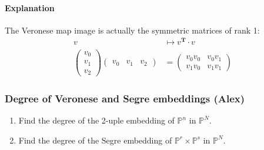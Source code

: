 \paragraph{Explanation} The Veronese map image is actually the symmetric matrices of rank 1:
\begin{align*}
	v&\longmapsto v^{\mathbf{T}}\cdot v\\
	\begin{pmatrix} v_0\\v_1\\v_2 \end{pmatrix} \begin{pmatrix} v_0&v_1&v_2 \end{pmatrix} & =\begin{pmatrix} v_0v_0&v_0v_1\\v_1v_0&v_1v_1 \end{pmatrix} 
\end{align*}

\subsubsection{Degree of Veronese and Segre embeddings (Alex)}

\begin{manualexercise}{7.1}\leavevmode 
	\begin{enumerate}[label=\alph*.]
		\item Find the degree of the 2-uple embedding of $\mathbb{P}^n$ in $\mathbb{P}^N$.

		\item Find the degree of the Segre embedding of $\mathbb{P}^r\times \mathbb{P}^s$ in $\mathbb{P}^N$.
	\end{enumerate}
\end{manualexercise}

